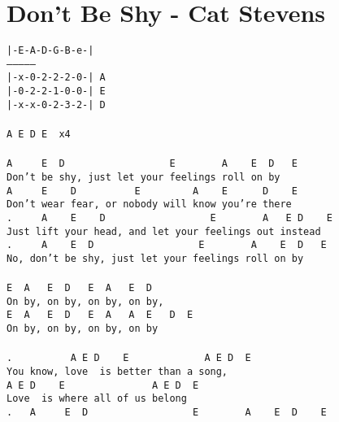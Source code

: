 \newpage
\section{Don't Be Shy - Cat Stevens}
\label{Don't Be Shy - Cat Stevens}
\texttt{|-E-A-D-G-B-e-|\\
---------------\\
|-x-0-2-2-2-0-|\ A\\
|-0-2-2-1-0-0-|\ E\\
|-x-x-0-2-3-2-|\ D\\
\\
A\ E\ D\ E\ \ x4\\
\\
A\ \ \ \ \ E\ \ D\ \ \ \ \ \ \ \ \ \ \ \ \ \ \ \ \ \ E\ \ \ \ \ \ \ \ A\ \ \ \ E\ \ D\ \ \ E\\
Don't\ be\ shy,\ just\ let\ your\ feelings\ roll\ on\ by\\
A\ \ \ \ \ E\ \ \ \ D\ \ \ \ \ \ \ \ \ \ E\ \ \ \ \ \ \ \ \ A\ \ \ \ E\ \ \ \ \ \ D\ \ \ \ E\\
Don't\ wear\ fear,\ or\ nobody\ will\ know\ you're\ there\\
.\ \ \ \ \ A\ \ \ \ E\ \ \ \ D\ \ \ \ \ \ \ \ \ \ \ \ \ \ \ \ \ \ E\ \ \ \ \ \ \ \ A\ \ \ E\ D\ \ \ \ E\\
Just\ lift\ your\ head,\ and\ let\ your\ feelings\ out\ instead\\
.\ \ \ \ \ A\ \ \ \ E\ \ D\ \ \ \ \ \ \ \ \ \ \ \ \ \ \ \ \ \ E\ \ \ \ \ \ \ \ A\ \ \ \ E\ \ D\ \ \ E\\
No,\ don't\ be\ shy,\ just\ let\ your\ feelings\ roll\ on\ by\\
\\
E\ \ A\ \ \ E\ \ D\ \ \ E\ \ A\ \ \ E\ \ D\\
On\ by,\ on\ by,\ on\ by,\ on\ by,\ \\
E\ \ A\ \ \ E\ \ D\ \ \ E\ \ A\ \ \ A\ \ E\ \ \ D\ \ E\\
On\ by,\ on\ by,\ on\ by,\ on\ by\\
\\
.\ \ \ \ \ \ \ \ \ \ A\ E\ D\ \ \ \ E\ \ \ \ \ \ \ \ \ \ \ \ \ A\ E\ D\ \ E\\
You\ know,\ love\ \ is\ better\ than\ a\ song,\\
A\ E\ D\ \ \ \ E\ \ \ \ \ \ \ \ \ \ \ \ \ \ \ A\ E\ D\ \ E\ \\
Love\ \ is\ where\ all\ of\ us\ belong\\
.\ \ \ A\ \ \ \ \ E\ \ D\ \ \ \ \ \ \ \ \ \ \ \ \ \ \ \ \ \ E\ \ \ \ \ \ \ \ A\ \ \ \ E\ \ D\ \ \ \ E\\
}
